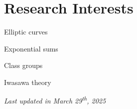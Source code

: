 \documentclass[11pt]{article}
\begin{document}
\section{Research Interests}
\begin{multicols}{2}
	\begin{cvlist}
		\item Elliptic curves
		\item Exponential sums
		\item Class groups
		\item Iwasawa theory
	\end{cvlist}
\end{multicols}

\medskip\emph{Last updated in March 29\textsuperscript{th}, 2025}
\end{document}

